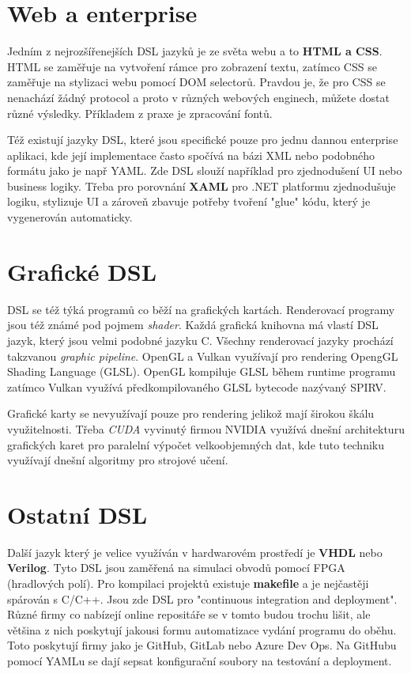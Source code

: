 \documentclass[male,czech]{kithesis}
\begin{document}
\section{Web a enterprise}
Jedním z nejrozšířenejších DSL jazyků je ze světa webu a to \textbf{HTML a CSS}. HTML se zaměřuje na vytvoření rámce pro zobrazení textu,
zatímco CSS se zaměřuje na stylizaci webu pomocí DOM selectorů. Pravdou je, že pro CSS se nenachází žádný 
protocol a proto v různých webových enginech, můžete dostat různé výsledky. Příkladem z praxe je zpracování
fontů.

Též existují jazyky DSL, které jsou specifické pouze pro jednu dannou enterprise aplikaci, kde její implementace
často spočívá na bázi XML nebo podobného formátu jako je např YAML. Zde DSL slouží například pro 
zjednodušení UI nebo business logiky. Třeba pro porovnání \textbf{XAML} pro .NET platformu zjednodušuje logiku, 
stylizuje UI a zároveň zbavuje potřeby tvoření "glue" kódu, který je vygenerován automaticky.

\section{Grafické DSL}
DSL se též týká programů co běží na grafických kartách. 
Renderovací programy jsou též známé pod pojmem \textit{shader}.
Každá grafická knihovna má vlastí DSL jazyk, který jsou velmi
podobné jazyku C. Všechny renderovací jazyky prochází takzvanou 
\textit{graphic pipeline}. OpenGL a Vulkan využívají pro rendering 
OpengGL Shading Language (GLSL). OpenGL kompiluje GLSL během runtime 
programu zatímco Vulkan využívá předkompilovaného GLSL bytecode nazývaný SPIRV.

Grafické karty se nevyužívají pouze pro rendering jelikož mají širokou škálu
využitelnosti. 
Třeba \textit{CUDA} vyvinutý firmou NVIDIA 
využívá dnešní architekturu grafických karet pro paralelní výpočet 
velkoobjemných dat, kde tuto techniku využívají dnešní algoritmy pro 
strojové učení. 

\section{Ostatní DSL}
Další jazyk který je velice využíván v hardwarovém prostředí je \textbf{VHDL} nebo \textbf{Verilog}. Tyto DSL jsou zaměřená
na simulaci obvodů pomocí FPGA (hradlových polí). 
Pro kompilaci projektů existuje \textbf{makefile} a je nejčastěji spárován s C/C++. 
Jsou zde DSL pro "continuous integration and deployment". 
Různé firmy co nabízejí online repositáře se v tomto budou trochu lišit, ale
většina z nich poskytují jakousi formu automatizace vydání programu do oběhu. Toto poskytují firmy jako je GitHub,
GitLab nebo Azure Dev Ops. Na GitHubu pomocí YAMLu se dají sepsat konfigurační soubory 
na testování a deployment.
\end{document}
